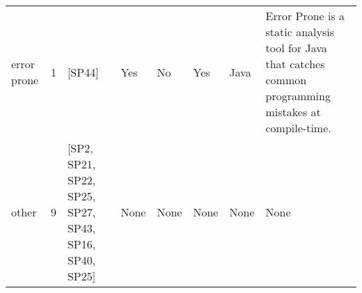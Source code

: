 \begin{tabular}{lrllllll}
         error prone &      1 &                                                 [SP44] &   Yes &       No &       Yes &                                                                                                                                                                                    Java &                                                                                                                                                                                                                                                                                                         Error Prone is a static analysis tool for Java that catches common programming mistakes at compile-time. \\
               other &      9 &  [SP2, SP21, SP22, SP25, SP27, SP43, SP16, SP40, SP25] &  None &     None &      None &                                                                                                                                                                                    None &                                                                                                                                                                                                                                                                                                                                                                                                             None \\
\bottomrule
\end{tabular}
